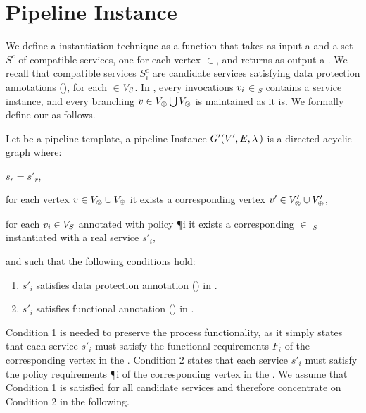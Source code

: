   \section{Pipeline Instance}
  We define a \pipeline instantiation technique as a function that takes as input a \pipelineTemplate \tChartFunction and a set $S^c$ of compatible services, one for each vertex $\in$\V, and returns as output a \pipelineInstance \iChartFunction. We recall that compatible services $S^c_i$ are candidate services satisfying data protection annotations \myLambda(), for each $\in$$V_S$.
  In \iChartFunction, every invocations $v_{i}$$\in$\V$_S$ contains a service instance, and every branching $v\in V_{\oplus}\bigcup V_{\otimes}$ is maintained as it is. We formally define our \pipelineInstance as follows.

  \begin{definition}\label{def:instance}
    Let \tChartFunction be a pipeline template, a pipeline Instance $G'(V',E,\lambda\,)$ is a directed acyclic graph where:
    \begin{enumerate*}[label=\roman*)]
      \item $s_r=s'_r$,
      \item for each vertex $v_{}\in V_{\otimes}\cup V_{\oplus}$ it exists a corresponding vertex $v'_{}\in V'_{\otimes}\cup V'_{\oplus}$,
      \item for each $v_{i}\in V_S$ annotated with policy \P{i} it exists a corresponding $\in$ \Vp$_S$ instantiated with a real service $s'_i$,
    \end{enumerate*}
    and such that the following conditions hold:
    \begin{enumerate}[label=\arabic*)]
      \item $s'_i$ satisfies data protection annotation \myLambda() in \tChartFunction.
      \item $s'_i$ satisfies functional annotation \myGamma() in \tChartFunction.
    \end{enumerate}
  \end{definition}

  Condition 1 is needed to preserve the process functionality, as it simply states that each service $s'_i$ must satisfy the functional requirements $F_i$ of the corresponding vertex  in the \pipelineTemplate.
  Condition 2 states that each service $s'_i$ must satisfy the policy requirements \P{i} of the corresponding vertex  in the \pipelineTemplate.
  We assume that Condition 1 is satisfied for all candidate services and therefore concentrate on Condition 2 in the following.

